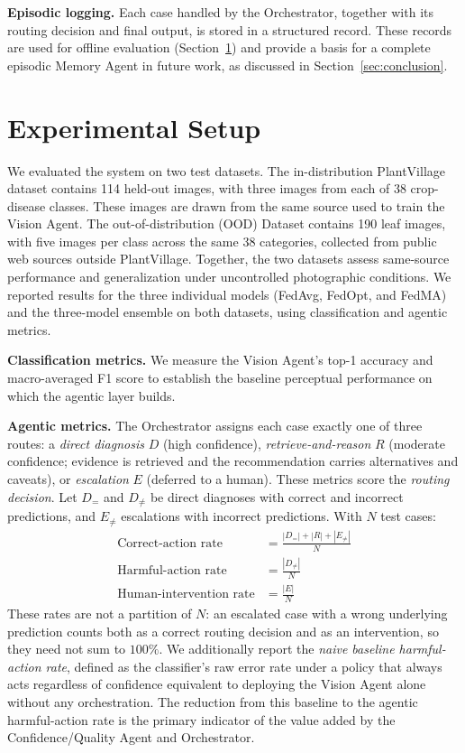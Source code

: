 \documentclass[conference]{IEEEtran}
\begin{document}
\textbf{Episodic logging.} Each case handled by the Orchestrator, together with its routing decision and final output, is stored in a structured record. These records are used for offline evaluation (Section~\ref{sec:exp}) and provide a basis for a complete episodic Memory Agent in future work, as discussed in Section~\ref{sec:conclusion}.

\section{Experimental Setup}
\label{sec:exp}

We evaluated the system on two test datasets. The in-distribution PlantVillage dataset contains 114 held-out images, with three images from each of 38 crop-disease classes. These images are drawn from the same source used to train the Vision Agent. The out-of-distribution (OOD) Dataset contains 190 leaf images, with five images per class across the same 38 categories, collected from public web sources outside PlantVillage. Together, the two datasets assess same-source performance and generalization under uncontrolled photographic conditions. We reported results for the three individual models (FedAvg, FedOpt, and FedMA) and the three-model ensemble on both datasets, using classification and agentic metrics.

\textbf{Classification metrics.} We measure the Vision Agent's top-1 accuracy and macro-averaged F1 score to establish the baseline perceptual performance on which the agentic layer builds.

\textbf{Agentic metrics.} The Orchestrator assigns each case exactly one of three routes: a \emph{direct diagnosis} $D$ (high confidence), \emph{retrieve-and-reason} $R$ (moderate confidence; evidence is retrieved and the recommendation carries alternatives and caveats), or \emph{escalation} $E$ (deferred to a human). These metrics score the \emph{routing decision}. Let $D_{=}$ and $D_{\neq}$ be direct diagnoses with correct and incorrect predictions, and $E_{\neq}$ escalations with incorrect predictions. With $N$ test cases:
\begin{align}
\text{Correct-action rate} &= \frac{|D_{=}| + |R| + |E_{\neq}|}{N} \\
\text{Harmful-action rate} &= \frac{|D_{\neq}|}{N} \\
\text{Human-intervention rate} &= \frac{|E|}{N}
\end{align}
These rates are not a partition of $N$: an escalated case with a wrong underlying prediction counts both as a correct routing decision and as an intervention, so they need not sum to $100\%$. We additionally report the \emph{naive baseline harmful-action rate}, defined as the classifier's raw error rate under a policy that always acts regardless of confidence equivalent to deploying the Vision Agent alone without any orchestration. The reduction from this baseline to the agentic harmful-action rate is the primary indicator of the value added by the Confidence/Quality Agent and Orchestrator.
\end{document}

